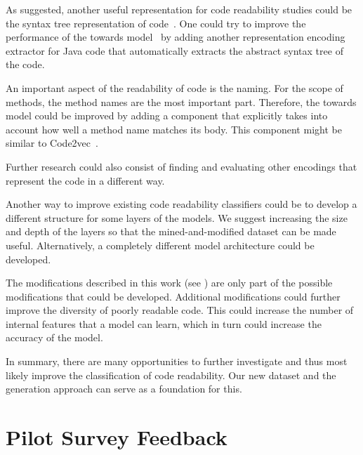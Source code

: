 \documentclass[%
class=scrreprt,
chapterprefix=false,%
open=right,%
twoside=false,%
paper=a4,%
logofile={Logo\_zentral\_farbig\_EN.png},%
thesistype=master,%
UKenglish,%
]{se2thesis}
\renewcommand{\thesection}{\arabic{section}}
\renewcommand{\thechapter}{\arabic{chapter}.0}
\theoremstyle{definition}
\begin{document}
	As \citeauthor{mi2023graph} suggested, another useful representation for code readability studies could be the syntax tree representation of code~\cite{mi2023graph}. One could try to improve the performance of the towards model~\cite{mi2022towards} by adding another representation encoding extractor for Java code that automatically extracts the abstract syntax tree of the code.
	
	An important aspect of the readability of code is the naming. For the scope of methods, the method names are the most important part. Therefore, the towards model could be improved by adding a component that explicitly takes into account how well a method name matches its body. This component might be similar to Code2vec~\cite{alon2019code2vec}.
	
	Further research could also consist of finding and evaluating other encodings that represent the code in a different way.
	
	Another way to improve existing code readability classifiers could be to develop a different structure for some layers of the models. We suggest increasing the size and depth of the layers so that the mined-and-modified dataset can be made useful. Alternatively, a completely different model architecture could be developed. 
	
	The modifications described in this work (see ) are only part of the possible modifications that could be developed. Additional modifications could further improve the diversity of poorly readable code. This could increase the number of internal features that a model can learn, which in turn could increase the accuracy of the model.
	
	In summary, there are many opportunities to further investigate and thus most likely improve the classification of code readability. Our new dataset and the generation approach can serve as a foundation for this.
	
\authorshipDeclaration
	
\backmatter

\printbibliography
	
	\appendix
	\renewcommand{\thechapter}{\alph{chapter}}
	\renewcommand{\thesection}{\Roman{section}}
	\renewcommand{\thesubsection}{\fnsymbol{subsection}}
	
\pagebreak
\section{Pilot Survey Feedback}\label{appendix:pilot-survey-feedback}
\end{document}
